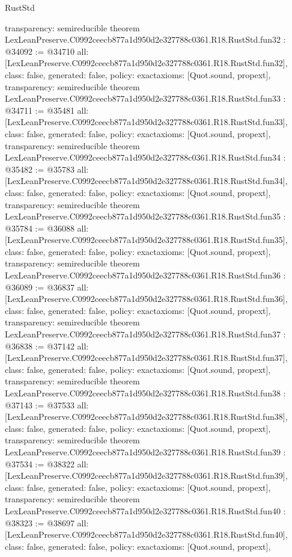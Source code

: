 \begin{lexlean}{RustStd}
\begin{coremodule}
{  transparency: semireducible
}
theorem LexLeanPreserve.C0992ceecb877a1d950d2e327788c0361.R18.RustStd.fun32 : @34092 := @34710 {
  all: [LexLeanPreserve.C0992ceecb877a1d950d2e327788c0361.R18.RustStd.fun32],
  class: false,
  generated: false,
  policy: exact{axioms: [Quot.sound, propext]},
  transparency: semireducible
}
theorem LexLeanPreserve.C0992ceecb877a1d950d2e327788c0361.R18.RustStd.fun33 : @34711 := @35481 {
  all: [LexLeanPreserve.C0992ceecb877a1d950d2e327788c0361.R18.RustStd.fun33],
  class: false,
  generated: false,
  policy: exact{axioms: [Quot.sound, propext]},
  transparency: semireducible
}
theorem LexLeanPreserve.C0992ceecb877a1d950d2e327788c0361.R18.RustStd.fun34 : @35482 := @35783 {
  all: [LexLeanPreserve.C0992ceecb877a1d950d2e327788c0361.R18.RustStd.fun34],
  class: false,
  generated: false,
  policy: exact{axioms: [Quot.sound, propext]},
  transparency: semireducible
}
theorem LexLeanPreserve.C0992ceecb877a1d950d2e327788c0361.R18.RustStd.fun35 : @35784 := @36088 {
  all: [LexLeanPreserve.C0992ceecb877a1d950d2e327788c0361.R18.RustStd.fun35],
  class: false,
  generated: false,
  policy: exact{axioms: [Quot.sound, propext]},
  transparency: semireducible
}
theorem LexLeanPreserve.C0992ceecb877a1d950d2e327788c0361.R18.RustStd.fun36 : @36089 := @36837 {
  all: [LexLeanPreserve.C0992ceecb877a1d950d2e327788c0361.R18.RustStd.fun36],
  class: false,
  generated: false,
  policy: exact{axioms: [Quot.sound, propext]},
  transparency: semireducible
}
theorem LexLeanPreserve.C0992ceecb877a1d950d2e327788c0361.R18.RustStd.fun37 : @36838 := @37142 {
  all: [LexLeanPreserve.C0992ceecb877a1d950d2e327788c0361.R18.RustStd.fun37],
  class: false,
  generated: false,
  policy: exact{axioms: [Quot.sound, propext]},
  transparency: semireducible
}
theorem LexLeanPreserve.C0992ceecb877a1d950d2e327788c0361.R18.RustStd.fun38 : @37143 := @37533 {
  all: [LexLeanPreserve.C0992ceecb877a1d950d2e327788c0361.R18.RustStd.fun38],
  class: false,
  generated: false,
  policy: exact{axioms: [Quot.sound, propext]},
  transparency: semireducible
}
theorem LexLeanPreserve.C0992ceecb877a1d950d2e327788c0361.R18.RustStd.fun39 : @37534 := @38322 {
  all: [LexLeanPreserve.C0992ceecb877a1d950d2e327788c0361.R18.RustStd.fun39],
  class: false,
  generated: false,
  policy: exact{axioms: [Quot.sound, propext]},
  transparency: semireducible
}
theorem LexLeanPreserve.C0992ceecb877a1d950d2e327788c0361.R18.RustStd.fun40 : @38323 := @38697 {
  all: [LexLeanPreserve.C0992ceecb877a1d950d2e327788c0361.R18.RustStd.fun40],
  class: false,
  generated: false,
  policy: exact{axioms: [Quot.sound, propext]},
}
\end{coremodule}
\end{lexlean}
